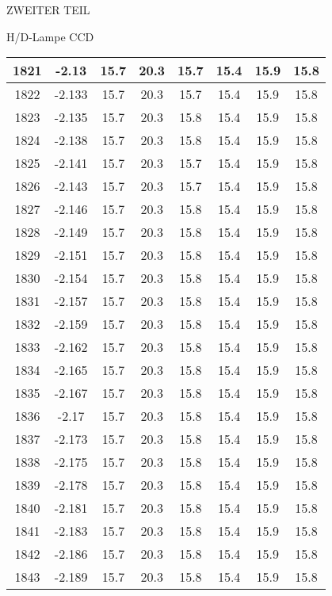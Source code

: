 \begin{appendix}
\begin{chapter}{ZWEITER TEIL}
\begin{section}{H/D-Lampe CCD}
\begin{scriptsize}
\begin{longtable}[htbp]{|c|c|c|c|c|c|c|c|}
            1821 & -2.13 & 15.7 & 20.3 & 15.7 & 15.4 & 15.9 & 15.8 \\ \hline
            1822 & -2.133 & 15.7 & 20.3 & 15.7 & 15.4 & 15.9 & 15.8 \\ \hline
            1823 & -2.135 & 15.7 & 20.3 & 15.8 & 15.4 & 15.9 & 15.8 \\ \hline
            1824 & -2.138 & 15.7 & 20.3 & 15.8 & 15.4 & 15.9 & 15.8 \\ \hline
            1825 & -2.141 & 15.7 & 20.3 & 15.7 & 15.4 & 15.9 & 15.8 \\ \hline
            1826 & -2.143 & 15.7 & 20.3 & 15.7 & 15.4 & 15.9 & 15.8 \\ \hline
            1827 & -2.146 & 15.7 & 20.3 & 15.8 & 15.4 & 15.9 & 15.8 \\ \hline
            1828 & -2.149 & 15.7 & 20.3 & 15.8 & 15.4 & 15.9 & 15.8 \\ \hline
            1829 & -2.151 & 15.7 & 20.3 & 15.8 & 15.4 & 15.9 & 15.8 \\ \hline
            1830 & -2.154 & 15.7 & 20.3 & 15.8 & 15.4 & 15.9 & 15.8 \\ \hline
            1831 & -2.157 & 15.7 & 20.3 & 15.8 & 15.4 & 15.9 & 15.8 \\ \hline
            1832 & -2.159 & 15.7 & 20.3 & 15.8 & 15.4 & 15.9 & 15.8 \\ \hline
            1833 & -2.162 & 15.7 & 20.3 & 15.8 & 15.4 & 15.9 & 15.8 \\ \hline
            1834 & -2.165 & 15.7 & 20.3 & 15.8 & 15.4 & 15.9 & 15.8 \\ \hline
            1835 & -2.167 & 15.7 & 20.3 & 15.8 & 15.4 & 15.9 & 15.8 \\ \hline
            1836 & -2.17 & 15.7 & 20.3 & 15.8 & 15.4 & 15.9 & 15.8 \\ \hline
            1837 & -2.173 & 15.7 & 20.3 & 15.8 & 15.4 & 15.9 & 15.8 \\ \hline
            1838 & -2.175 & 15.7 & 20.3 & 15.8 & 15.4 & 15.9 & 15.8 \\ \hline
            1839 & -2.178 & 15.7 & 20.3 & 15.8 & 15.4 & 15.9 & 15.8 \\ \hline
            1840 & -2.181 & 15.7 & 20.3 & 15.8 & 15.4 & 15.9 & 15.8 \\ \hline
            1841 & -2.183 & 15.7 & 20.3 & 15.8 & 15.4 & 15.9 & 15.8 \\ \hline
            1842 & -2.186 & 15.7 & 20.3 & 15.8 & 15.4 & 15.9 & 15.8 \\ \hline
            1843 & -2.189 & 15.7 & 20.3 & 15.8 & 15.4 & 15.9 & 15.8 \\ \hline

\end{longtable}
\end{scriptsize}
\end{section}
\end{chapter}
\end{appendix}
